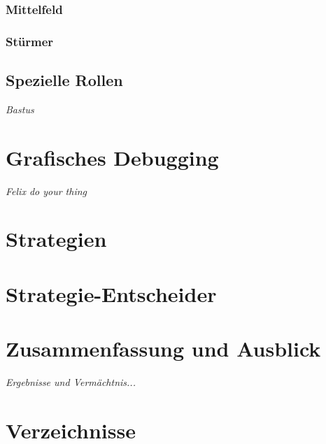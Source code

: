 \documentclass[fontsize=12pt,a4paper,draft]{scrartcl}[2003/01/01]
\begin{document}
\subsubsection{Mittelfeld}
\subsubsection{Stürmer}

\subsection{Spezielle Rollen}
\textit{Bastus}
\section{Grafisches Debugging}
\textit{Felix do your thing}

\section{Strategien}

\section{Strategie-Entscheider}

\section{Zusammenfassung und Ausblick}
\textit{Ergebnisse und Vermächtnis...}

\section{Verzeichnisse}
\listoffigures
\end{document}
